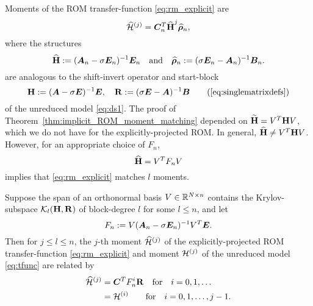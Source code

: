 Moments of the ROM transfer-function \eqref{eq:rm_explicit} are
\[
\widehat{\mathcal{H}}^{(j)} =\bm{C}_n^T \widehat{\textbf{\textup{H}}}^j \widehat{\boldsymbol{\rho}}_n, 
\]
where the structures
\begin{equation}
 \widehat{\textbf{\textup{H}}} := (\bm{A}_n - \sigma \bm{E}_n)^{-1}\bm{E}_n\quad\textrm{and}\quad \widehat{\boldsymbol{\rho}}_n := (\sigma \bm{E}_n-\bm{A}_n)^{-1}\bm{B}_n.        
        \label{eq:explict_ROM_op}
\end{equation} 
are analogous  to the shift-invert operator and start-block  
\begin{equation}
                        \H := (\A - \sigma \E)^{-1}\E, \quad \RR := (\sigma \E-\A)^{-1}\BB        
        \tag{\ref{eq:singlematrixdefs}}
        \end{equation}
of the unreduced model \eqref{eq:ds1}.
The proof of Theorem~\ref{thm:implicit_ROM_moment_matching}
depended on  $\widetilde{\textbf{\textup{H}}}=V^T \textbf{\textup{H}} V$, which we do not have for the explicitly-projected ROM.  In general, $\widehat{\textbf{\textup{H}}} \neq V^T \textbf{\textup{H}} V$.
However, for an appropriate choice of $F_n$, 
\[
\widehat{\textbf{\textup{H}}} = V^T F_n V
\]
implies that \eqref{eq:rm_explicit} matches $l$ moments.

\bigskip
\begin{theorem}
\label{thm:explicit_ROM_moment_matching}
Suppose the span of an orthonormal basis $V\in\mathbb{R}^{N\times n}$ contains the Krylov-subspace  $\mathcal{K}_{l}({\textbf{\textup{H}}},{\textbf{\textup{R}}})$ of block-degree $l$ for some $l\leq n$, and let 
\begin{equation}
F_n :=  V(\bm{A}_n-\sigma \bm{E}_n)^{-1}V^T \bm{E}.
\label{eq:F_n}
\end{equation}
Then for $j\leq l \leq n$, the $j$-th moment  $\widehat{\mathcal{H}}^{(j)}$ of the explicitly-projected ROM transfer-function \eqref{eq:rm_explicit} and moment $\mathcal{H}^{(j)}$ of the unreduced model \eqref{eq:tfunc} are related by
\begin{align}
\widehat{\mathcal{H}}^{(j)} &= \bm{C}^T F^i_n \textbf{\textup{R}} \quad \text{for}\quad i= 0,1,\ldots \label{eq:rmo_match} \\
		&= \mathcal{H}^{(i)} \qquad \text{for}\quad i =0,1,\ldots,j-1.     \label{eq:mo_match}
\end{align}
\end{theorem}

